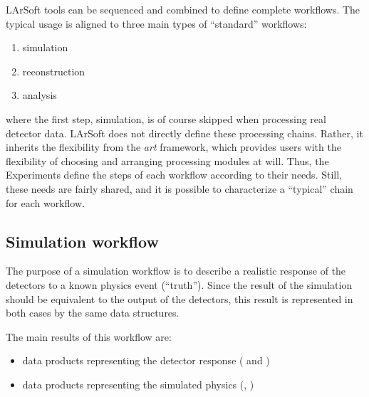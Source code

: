 
LArSoft tools can be sequenced and combined to define complete workflows.
The typical usage is aligned to three main types of ``standard'' workflows: %
\begin{enumerate}
  \item simulation
  \item reconstruction
  \item analysis
\end{enumerate}
where the first step, simulation, is of course skipped when processing real detector data.
LArSoft does not directly define these processing chains.
Rather, it inherits the flexibility from the \emph{art} framework,
which provides users with the flexibility of choosing and arranging processing modules at will.
Thus, the Experiments define the steps of each workflow according to their needs.
Still, these needs are fairly shared,
and it is possible to characterize a ``typical'' chain for each workflow.


\subsection{Simulation workflow}
\label{ssec:Workflows:Simulation}

The purpose of a simulation workflow is to describe a realistic response of
the detectors to a known physics event (``truth'').
Since the result of the simulation should be equivalent to the output of the detectors,
this result is represented in both cases by the same data structures.

The main results of this workflow are:
\begin{itemize}
   \item data products representing the detector response (\eg {} and )
   \item data products representing the simulated physics (\eg {}, )
\end{itemize}

